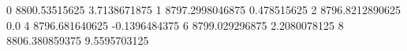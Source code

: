 0 8800.53515625 3.7138671875
1 8797.2998046875 0.478515625
2 8796.8212890625 0.0
4 8796.681640625 -0.1396484375
6 8799.029296875 2.2080078125
8 8806.380859375 9.5595703125
